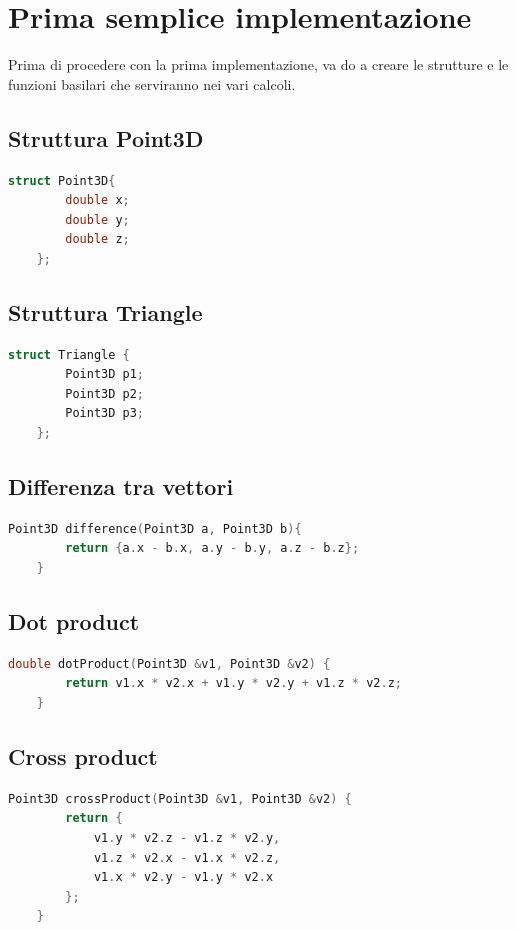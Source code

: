 \documentclass[a4paper]{article}
\begin{document}
\newpage

\section{Prima semplice implementazione}
Prima di procedere con la prima implementazione, va do a creare le strutture e le funzioni basilari che serviranno nei vari calcoli.

\subsection{Struttura Point3D}
\begin{lstlisting}[language=c++]
    struct Point3D{
        double x;
        double y;
        double z;
    };
\end{lstlisting}

\subsection{Struttura Triangle}
\begin{lstlisting}[language=c++]
    struct Triangle {
        Point3D p1;
        Point3D p2;
        Point3D p3;
    };

\end{lstlisting}

\subsection{Differenza tra vettori}
\begin{lstlisting}[language=c++]
    Point3D difference(Point3D a, Point3D b){
        return {a.x - b.x, a.y - b.y, a.z - b.z};
    }
\end{lstlisting}

\subsection{Dot product}
\begin{lstlisting}[language=c++]
    double dotProduct(Point3D &v1, Point3D &v2) {
        return v1.x * v2.x + v1.y * v2.y + v1.z * v2.z;
    }
\end{lstlisting}

\subsection{Cross product}
\begin{lstlisting}[language=c++]
    Point3D crossProduct(Point3D &v1, Point3D &v2) {
        return {
            v1.y * v2.z - v1.z * v2.y, 
            v1.z * v2.x - v1.x * v2.z,
            v1.x * v2.y - v1.y * v2.x
        };
    }
\end{lstlisting}
\end{document}
